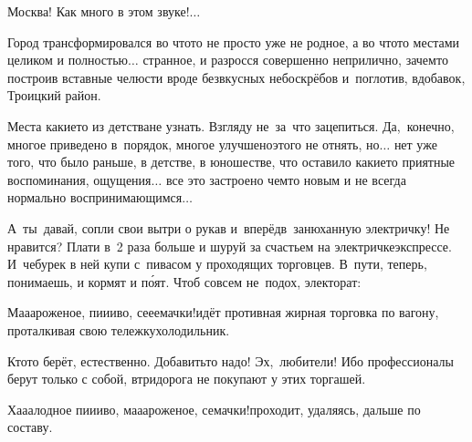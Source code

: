 %

\diagdash Москва! Как много в этом звуке!$\ldots$ 

Город трансформировался во что\sdash то не просто уже не родное, а во что\sdash то местами целиком и полностью$\ldots$ странное, и разросся совершенно неприлично, зачем\sdash то построив вставные челюсти вроде безвкусных небоскрёбов и~поглотив, вдобавок, Троицкий район. 

Места какие\sdash то из детства\mdash не узнать. Взгляду не~за~что зацепиться. Да,~конечно, многое приведено в~порядок, многое улучшено\mdash этого не отнять, но$\ldots$ нет уже того, что было раньше, в детстве, в юношестве, что оставило какие\sdash то приятные воспоминания, ощущения$\ldots$ все это застроено чем\sdash то новым и не всегда нормально воспринимающимся$\ldots$

А~ты~давай, сопли свои вытри о рукав и~вперёд\mdash в~занюханную электричку! Не нравится? Плати в~2 раза больше и шуруй за счастьем на электричке\sdash экспрессе. И~чебурек в ней купи с~пивасом у проходящих торговцев. В~пути, теперь, понимаешь, и кормят и п\'{о}ят. Чтоб совсем не~подох, электорат:

\diagdash Ма\sdash а\sdash ароженое, пи\sdash и\sdash иво, се\sdash е\sdash емачки!\mdash идёт противная жирная торговка по вагону, проталкивая свою тележку\sdash холодильник.

Кто\sdash то берёт, естественно. Добавить\sdash то надо! Эх,~любители! Ибо профессионалы берут только с собой, втридорога не покупают у этих торгашей.

\diagdash Ха\sdash а\sdash алодное пи\sdash и\sdash иво, ма\sdash а\sdash ароженое, семачки!\mdash проходит, удаляясь, дальше по составу.

